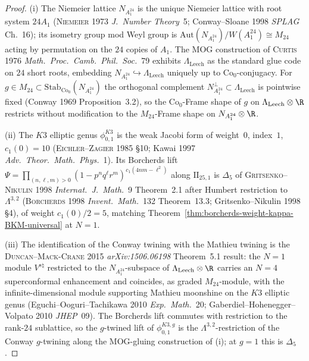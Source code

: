 \begin{proof}
(i) The Niemeier lattice $N_{A_1^{24}}$ is the unique Niemeier lattice
with root system $24A_1$ \textup{(}\textsc{Niemeier 1973} \emph{J.\
Number Theory}~5; Conway--Sloane 1998 \emph{SPLAG} Ch.~16\textup{)};
its isometry group mod Weyl group is
$\mathrm{Aut}(N_{A_1^{24}})/W(A_1^{24})\cong M_{24}$ acting by
permutation on the $24$ copies of $A_1$. The MOG construction of
\textsc{Curtis 1976} \emph{Math.\ Proc.\ Camb.\ Phil.\ Soc.}~79
exhibits $\Lambda_{\mathrm{Leech}}$ as the standard glue code on
$24$ short roots, embedding $N_{A_1^{24}}\hookrightarrow
\Lambda_{\mathrm{Leech}}$ uniquely up to $\mathrm{Co}_0$-conjugacy.
For $g\in M_{24}\subset\mathrm{Stab}_{\mathrm{Co}_0}(N_{A_1^{24}})$
the orthogonal complement $N_{A_1^{24}}^\perp\subset
\Lambda_{\mathrm{Leech}}$ is pointwise fixed \textup{(}Conway 1969
Proposition~3.2\textup{)}, so the $\mathrm{Co}_0$-Frame shape of $g$
on $\Lambda_{\mathrm{Leech}}\otimes\R$ restricts without
modification to the $M_{24}$-Frame shape on $N_{A_1^{24}}\otimes\R$.

(ii) The $K3$ elliptic genus $\phi_{0,1}^{K3}$ is the weak Jacobi
form of weight~$0$, index~$1$, $c_1(0)=10$
\textup{(}\textsc{Eichler--Zagier 1985} \S10; Kawai 1997 \emph{Adv.\
Theor.\ Math.\ Phys.}~1\textup{)}. Its Borcherds lift
$\Psi = \prod_{(n,\ell,m)>0}(1-p^n q^\ell r^m)^{c_1(4nm-\ell^2)}$
along $\mathrm{II}_{25,1}$ is $\Delta_5$ of
\textsc{Gritsenko--Nikulin 1998} \emph{Internat.\ J.\ Math.}~9
Theorem~2.1 after Humbert restriction to $\Lambda^{3,2}$
\textup{(}\textsc{Borcherds 1998} \emph{Invent.\ Math.}~132
Theorem~13.3; Gritsenko--Nikulin 1998 \S4\textup{)}, of weight
$c_1(0)/2=5$, matching
Theorem~\ref{thm:borcherds-weight-kappa-BKM-universal} at $N=1$.

(iii) The identification of the Conway twining with the Mathieu
twining is the \textsc{Duncan--Mack-Crane 2015}
\emph{arXiv:1506.06198} Theorem~5.1 result: the $N=1$ module
$V^{s\natural}$ restricted to the $N_{A_1^{24}}$-subspace
of $\Lambda_{\mathrm{Leech}}\otimes\R$ carries an $N=4$
superconformal enhancement and coincides, as graded
$M_{24}$-module, with the infinite-dimensional module supporting
Mathieu moonshine on the $K3$ elliptic genus
\textup{(}Eguchi--Ooguri--Tachikawa 2010 \emph{Exp.\ Math.}~20;
Gaberdiel--Hohenegger--Volpato 2010 \emph{JHEP}~09\textup{)}. The
Borcherds lift commutes with restriction to the rank-$24$
sublattice, so the $g$-twined lift of $\phi_{0,1}^{K3,g}$ is the
$\Lambda^{3,2}$-restriction of the Conway $g$-twining along the
MOG-gluing construction of (i); at $g=1$ this is $\Delta_5$.
\end{proof}


